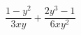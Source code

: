 \begin{ex}
	\begin{condition}
		\( \dfrac{1-y^2}{3xy}+\dfrac{2y^3-1}{6xy^2} \)
	\end{condition}
\end{ex}